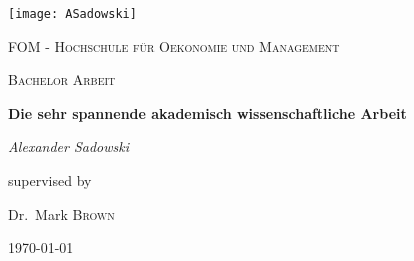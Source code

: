 \begin{titlepage}

	\centering
	\texttt{[image: ASadowski]}\par\vspace{1cm}
	{\scshape\LARGE FOM - Hochschule für Oekonomie und Management \par}
	\vspace{1cm}
	{\scshape\Large Bachelor Arbeit\par}
	\vspace{1.5cm}
	{\huge\bfseries Die sehr spannende akademisch wissenschaftliche Arbeit\par}
	\vspace{2cm}
	{\Large\itshape Alexander Sadowski\par}
	\vfill
	supervised by\par
	Dr.~Mark \textsc{Brown}

	\vfill

	{\large \today\par}
\end{titlepage}